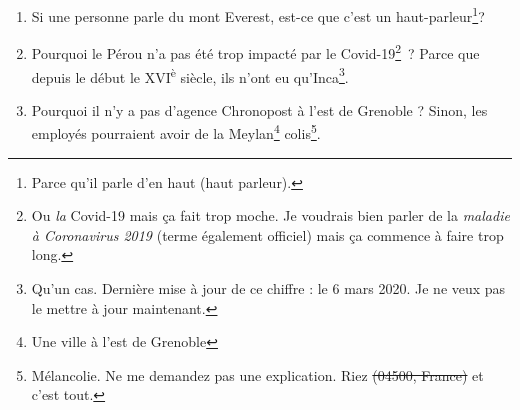 \documentclass[10pt,a5paper,fullpage]{book}
\begin{document}
\begin{enumerate}
\begin{itemize}
			\item[-] Oh mon Dieu, mais qu'as-tu encore fait~?
			\item[-] J’étais à la boulangerie et j’avais demandé « Je \textit{want some} pain, \textit{please}. »\footnote{\textit{Pain} en anglais = douleur. Aïe~! D'où l'importance des cours d'anglais.}.
		\end{itemize}
		\item Si une personne parle du mont Everest, est-ce que c’est un haut-parleur\footnote{Parce qu'il parle d'en haut (haut parleur).}?
		\item Pourquoi le Pérou n'a pas été trop impacté par le Covid-19\footnote{Ou \textit{la} Covid-19 mais ça fait trop moche. Je voudrais bien parler de la \textit{maladie à Coronavirus 2019} (terme également officiel) mais ça commence à faire trop long.}~? Parce que depuis le début le XVI\textsuperscript{è} siècle, ils n'ont eu qu'Inca\footnote{Qu'un cas. Dernière mise à jour de ce chiffre : le 6 mars 2020. Je ne veux pas le mettre à jour maintenant.}.
		\item Pourquoi il n'y a pas d'agence Chronopost à l'est de Grenoble ? Sinon, les employés pourraient avoir de la Meylan\footnote{Une ville à l'est de Grenoble} colis\footnote{Mélancolie. Ne me demandez pas une explication. Riez \sout{(04500, France)} et c'est tout.}. 
	\end{enumerate}
	
	
\end{document}
